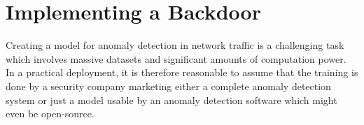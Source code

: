 \documentclass[10pt,sigconf,letterpaper]{acmart}
\begin{document}
\begin{table}
\begin{tabular}{l r r}

\bottomrule
\end{tabular}
\end{table}



\section{Implementing a Backdoor}
Creating a model for anomaly detection in network traffic is a challenging task which involves massive datasets and significant amounts of computation power. In a practical deployment, it is therefore reasonable to assume that the training is done by a security company marketing either a complete anomaly detection system or just a model usable by an anomaly detection software which might even be open-source.
\end{document}
